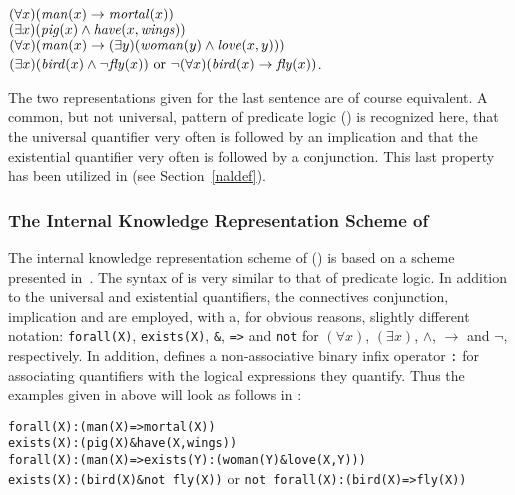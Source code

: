 \begin{center}
  $(\forall x)(\mbox{\em man\/}(x)\rightarrow\mbox{\em
  mortal\/}(x))$\\ $(\exists x)(\mbox{\em pig\/}(x)\wedge\mbox{\em
  have\/}(x,\mbox{\em wings\/}))$\\ $(\forall x)(\mbox{\em
  man\/}(x)\rightarrow(\exists y)(\mbox{\em woman\/}(y)\wedge\mbox{\em
  love\/}(x,y)))$\\ $(\exists x)(\mbox{\em
  bird\/}(x)\wedge\neg\mbox{\em fly\/}(x))\mbox{\ or\ }\neg(\forall
  x)(\mbox{\em bird\/}(x)\rightarrow\mbox{\em fly\/}(x))$.
\end{center}

\noindent The two representations given for the last sentence are of
course equivalent. A common, but not universal, pattern of predicate
logic (\cite{logic}) is recognized here, that the universal quantifier
very often is followed by an implication and that the existential
quantifier very often is followed by a conjunction. This last property
has been utilized in {\nash} (see Section~\ref{naldef}).

\subsubsection{The Internal Knowledge Representation Scheme of {\nash}}

The internal knowledge representation scheme of {\nash} ({\niks}) is
based on a scheme presented in~\cite{dcg}. The syntax of {\niks} is
very similar to that of predicate logic. In addition to the universal
and existential quantifiers, the connectives conjunction, implication
and are employed, with a, for obvious reasons, slightly different
notation: {\tt forall(X)}, {\tt exists(X)}, {\tt \&}, {\tt =>} and
{\tt not} for $(\forall x)$, $(\exists x)$, $\wedge$, $\rightarrow$
and $\neg$, respectively. In addition, {\niks} defines a
non-associative binary infix operator {\tt :} for associating
quantifiers with the logical expressions they quantify. Thus the
examples given in above will look as follows in {\niks}:

\begin{center}
  {\tt forall(X):(man(X)=>mortal(X))\\
  exists(X):(pig(X)\&have(X,wings))\\
  forall(X):(man(X)=>exists(Y):(woman(Y)\&love(X,Y)))\\
  exists(X):(bird(X)\&not fly(X))} or {\tt not
  forall(X):(bird(X)=>fly(X))}
\end{center}


